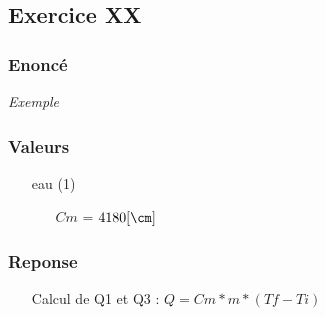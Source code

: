 
\subsection{Exercice XX}
\subsubsection{Enoncé}

\textit{Exemple}
\subsubsection{Valeurs}
\begin{itemize}
    \item[eau] (1)
    \item[] 
    \begin{itemize}
        \item[$Cm$] = $4180[\cm]$
    \end{itemize}
\end{itemize}
\subsubsection{Reponse}
\begin{itemize}
    \item[Calcul de Q1 et Q3] : $Q = Cm * m * (Tf-Ti)$
\end{itemize}